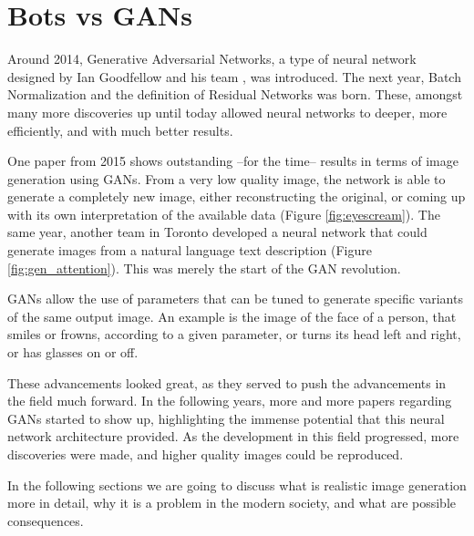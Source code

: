 \section{Bots vs GANs}

Around 2014, Generative Adversarial Networks, a type of neural network designed by Ian Goodfellow and his team \cite{goodfellow2014generative}, was introduced. The next year, Batch Normalization \cite{ioffe2015batch} and the definition of Residual Networks \cite{he2015deep} was born. These, amongst many more discoveries up until today allowed neural networks to deeper, more efficiently, and with much better results.

One paper from 2015 \cite{denton2015deep} shows outstanding --for the time-- results in terms of image generation using GANs. From a very low quality image, the network is able to generate a completely new image, either reconstructing the original, or coming up with its own interpretation of the available data (Figure \ref{fig:eyescream}). The same year, another team in Toronto developed a neural network that could generate images from a natural language text description (Figure \ref{fig:gen_attention}). This was merely the start of the GAN revolution.

GANs allow the use of parameters that can be tuned to generate specific variants of the same output image. An example is the image of the face of a person, that smiles or frowns, according to a given parameter, or turns its head left and right, or has glasses on or off.

These advancements looked great, as they served to push the advancements in the field much forward. In the following years, more and more papers regarding GANs started to show up, highlighting the immense potential that this neural network architecture provided. As the development in this field progressed, more discoveries were made, and higher quality images could be reproduced.

In the following sections we are going to discuss what is realistic image generation more in detail, why it is a problem in the modern society, and what are possible consequences.
